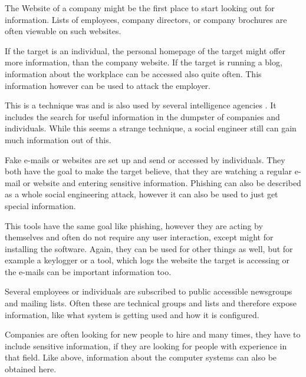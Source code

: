 \begin{description}

\item[Corporate Website] The Website of a company might be the first place to
  start looking out for information. Lists of employees,
  company directors, or company brochures are often viewable on such websites. 
\item[Personal Homepage] If the target is an individual, the personal homepage
  of the target might offer more information, than the company website. If the
  target is running a blog, information about the workplace can be accessed
  also quite often. This information however can be used to attack the
  employer.
\item[Dumpster Diving] This is a technique was and is also used by several
  intelligence agencies \cite{lively2003}. It includes the search
  for useful information in the dumpster of companies and individuals. While
  this seems a strange technique, a social engineer still can gain much
  information out of this.
\item[Phishing] Fake e-mails or websites are set up and send or accessed by
  individuals. They both have the goal to make the target believe, that they are
  watching a regular e-mail or website and entering sensitive information.
  Phishing can also be described as a whole social engineering attack, however
  it can also be used to just get special information.
\item[Trojan Horses and other Malware] This tools have the same goal like
  phishing, however they are acting by themselves and often do not require any
  user interaction, except might for installing the software. Again, they can
  be used for other things as well, but for example a keylogger or a tool,
  which logs the website the target is accessing or the e-mails can be
  important information too.
\item[Newsgroups and mailing lists] Several employees or individuals are
  subscribed to public accessible newsgroups and mailing lists. Often these are
  technical groups and lists and therefore expose information, like what system
  is getting used and how it is configured.
\item[Job Sites] Companies are often looking for new people to hire and many
  times, they have to include sensitive information, if they are looking for
  people with experience in that field. Like above, information about the
  computer systems can also be obtained here.
\end{description}


